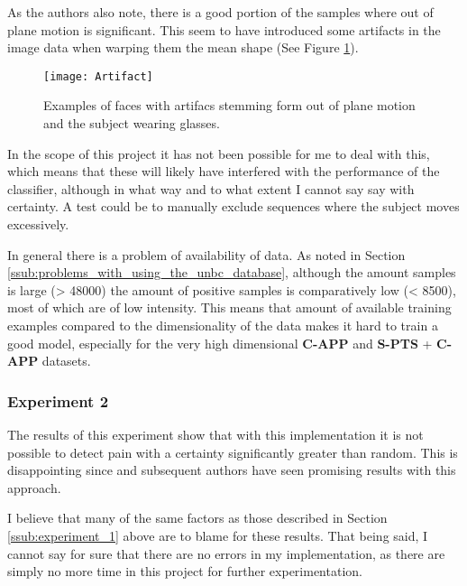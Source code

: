 \documentclass[Main]{subfiles}
\begin{document}
			As the authors also note, there is a good portion of the samples where out of plane motion is significant.
			This seem to have introduced some artifacts in the image data when warping them the mean shape (See Figure \ref{fig:artifact}).
			\begin{figure}[H]
				\begin{center}
					\texttt{[image: Artifact]}
				\end{center}
				\caption{Examples of faces with artifacs stemming form out of plane motion and the subject wearing glasses.}
				\label{fig:artifact}
			\end{figure}
			In the scope of this project it has not been possible for me to deal with this, which means that these will likely have interfered with the performance of the classifier, although in what way and to what extent I cannot say say with certainty.
			A test could be to manually exclude sequences where the subject moves excessively.

			In general there is a problem of availability of data.
			As noted in Section \ref{ssub:problems_with_using_the_unbc_database}, although the amount samples is large (> 48000) the amount of positive samples is comparatively low (< 8500), most of which are of low intensity.
			This means that amount of available training examples compared to the dimensionality of the data makes it hard to train a good model, especially for the very high dimensional \textbf{C-APP} and \textbf{S-PTS} + \textbf{C-APP} datasets.
			
		
		\subsubsection{Experiment 2} %
			\label{ssub:experiment_2}
			The results of this experiment show that with this implementation it is not possible to detect pain with a certainty significantly greater than random.
			This is disappointing since \cite{Lucey2011} and subsequent authors have seen promising results with this approach.

			I believe that many of the same factors as those described in Section \ref{ssub:experiment_1} above are to blame for these results.
			That being said, I cannot say for sure that there are no errors in my implementation, as there are simply no more time in this project for further experimentation.			



\end{document}
